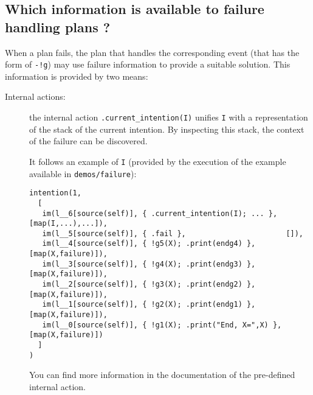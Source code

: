 \documentclass{article}
\begin{document}
\begin{description}
\subsection{Which information is available to failure handling plans ?}

When a plan fails, the plan that handles the corresponding event (that
has the form of \texttt{-!g}) may use failure information to provide a
suitable solution. This information is provided by two means:
\begin{description}
\item[Internal actions:] the internal action
  \texttt{.current\_intention(I)} unifies \texttt{I} with a
  representation of the stack of the current intention. By inspecting
  this stack, the context of the failure can be discovered.

  It follows an example of \texttt{I} (provided by the execution of the
  example available in \texttt{demos/failure}):
\begin{verbatim}
intention(1,
  [
   im(l__6[source(self)], { .current_intention(I); ... },  [map(I,...),...]),
   im(l__5[source(self)], { .fail },                       []),
   im(l__4[source(self)], { !g5(X); .print(endg4) },       [map(X,failure)]),
   im(l__3[source(self)], { !g4(X); .print(endg3) },       [map(X,failure)]),
   im(l__2[source(self)], { !g3(X); .print(endg2) },       [map(X,failure)]),
   im(l__1[source(self)], { !g2(X); .print(endg1) },       [map(X,failure)]),
   im(l__0[source(self)], { !g1(X); .print("End, X=",X) }, [map(X,failure)])
  ]
)
\end{verbatim}

  You can find more information in the documentation of the
  pre-defined internal action.



\end{description}
\end{description}
\end{document}
